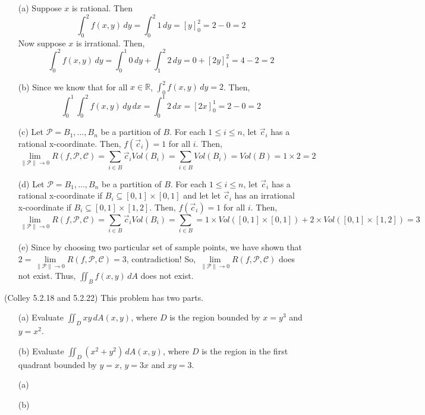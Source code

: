 \documentclass[11pt,letterpaper,cm]{nupset}
\begin{document}
\begin{solution}
	\begin{itemize}
		\item[(a)] Suppose $x$ is rational. Then
		$$\int_0^2 f(x,y)\,dy=\int_0^2 1\,dy=[y]_0^2=2-0=2$$
		Now suppose $x$ is irrational. Then,
		$$\int_0^2 f(x,y)\,dy=\int_0^1 0\,dy+\int_1^2 2\,dy=0+[2y]_1^2=4-2=2$$
		\item[(b)] Since we know that for all $x\in\mathbb{R}$, $\int_0^2 f(x,y)\,dy=2$. Then,
		$$\int_0^1\int_0^2 f(x,y)\,dy\,dx=\int_0^1 2\,dx=[2x]_0^1=2-0=2$$
		\item[(c)] Let $\mathcal{P}=B_1,\ldots,B_n$ be a partition of $B$. For each $1\leq i\leq n$, let $\vec{c}_i$ has a rational x-coordinate. Then, $f(\vec{c}_i)=1$ for all $i$. Then,
		$$\lim\limits_{\|\mathcal{P}\|\to 0} R(f,\mathcal{P},\mathcal{C})=\sum_{i\in B} \vec{c}_iVol(B_i)=\sum_{i\in B}Vol(B_i)=Vol(B)=1\times 2=2$$
		\item[(d)] Let $\mathcal{P}=B_1,\ldots,B_n$ be a partition of $B$. For each $1\leq i\leq n$, let $\vec{c}_i$ has a rational x-coordinate if $B_i\subseteq [0,1]\times[0,1]$ and let let $\vec{c}_i$ has an irrational x-coordinate if $B_i\subseteq[0,1]\times[1,2]$. Then, $f(\vec{c}_i)=1$ for all $i$. Then,
		$$\lim\limits_{\|\mathcal{P}\|\to 0} R(f,\mathcal{P},\mathcal{C})=\sum_{i\in B} \vec{c}_iVol(B_i)=\sum_{i\in B}=1\times Vol([0,1]\times[0,1])+2\times Vol([0,1]\times[1,2])=3$$
		\item[(e)] Since by choosing two particular set of sample points, we have shown that $2=\lim\limits_{\|\mathcal{P}\|\to 0} R(f,\mathcal{P},\mathcal{C})=3$, contradiction! So, $\lim\limits_{\|\mathcal{P}\|\to 0} R(f,\mathcal{P},\mathcal{C})$ does not exist. Thus, $\iint_B f(x,y)\,dA$ does not exist.
	\end{itemize}
\end{solution}
\newpage

\begin{problem}[Exercise 6] (Colley 5.2.18 and 5.2.22)  This problem has two parts.
	\begin{itemize}
		\item[(a)] Evaluate $\displaystyle\iint_D xy\,dA(x,y)$, where $D$ is the region bounded by $x=y^3$ and $y=x^2$.
		\item[(b)] Evaluate $\displaystyle\iint_D (x^2+y^2)\,dA(x,y)$, where $D$ is the region in the first quadrant bounded by $y=x$, $y=3x$ and $xy=3$.
	\end{itemize}
\end{problem}
\begin{solution}
	\begin{itemize}
		\item[(a)]
		\item[(b)]
	\end{itemize}
\end{solution}
\newpage
\end{document}
